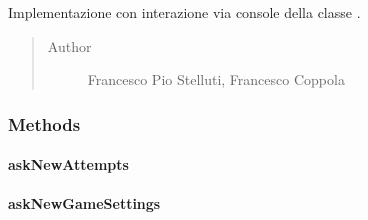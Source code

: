 \documentclass[letterpaper,10pt,italian]{sphinxmanual}
\begin{document}
\begin{fulllineitems}
\label{\detokenize{source/it/unicam/cs/pa/mastermind/ui/ConsoleStartView:it.unicam.cs.pa.mastermind.ui.ConsoleStartView}}
Implementazione con interazione via console della classe .
\begin{quote}\begin{description}
\item[{Author}] \leavevmode
Francesco Pio Stelluti, Francesco Coppola

\end{description}\end{quote}

\end{fulllineitems}



\subsubsection{Methods}
\label{\detokenize{source/it/unicam/cs/pa/mastermind/ui/ConsoleStartView:methods}}

\paragraph{askNewAttempts}
\label{\detokenize{source/it/unicam/cs/pa/mastermind/ui/ConsoleStartView:asknewattempts}}

\begin{fulllineitems}
\label{\detokenize{source/it/unicam/cs/pa/mastermind/ui/ConsoleStartView:it.unicam.cs.pa.mastermind.ui.ConsoleStartView.askNewAttempts()}}
\end{fulllineitems}



\paragraph{askNewGameSettings}
\label{\detokenize{source/it/unicam/cs/pa/mastermind/ui/ConsoleStartView:asknewgamesettings}}
\end{document}

